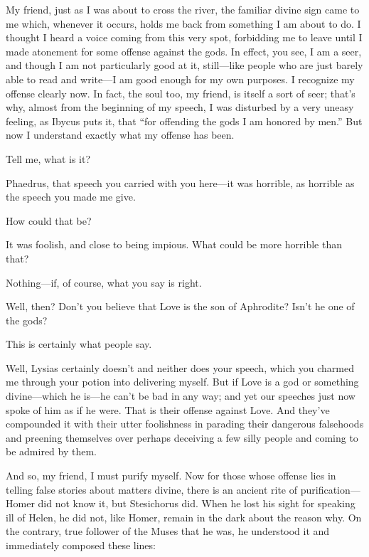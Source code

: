 \saysocrates My friend, just as I was about to cross the river, the
familiar divine sign came to me which, whenever it occurs, holds
me back from something I am about to do. I thought I heard a voice
coming from this very spot, forbidding me to leave until I made
atonement for some offense against the gods. In effect, you see, I am a
seer, and though I am not particularly good at it, still---like people
who are just barely able to read and write---I am good enough for my own
purposes. I recognize my offense clearly now. In fact, the soul too, my
friend, is itself a sort of seer; that’s why, almost from the beginning
of my speech, I was disturbed by a very uneasy feeling, as
Ibycus puts it, that “for offending the gods I am honored by
men.” But now I
understand exactly what my offense has been.

\sayphaedrus Tell me, what is it?

\saysocrates Phaedrus, that speech you carried with you here---it was
horrible, as horrible as the speech you made me give.

\sayphaedrus How could that be?

\saysocrates It was foolish, and close to being impious. What could be more
horrible than that?

\sayphaedrus Nothing---if, of course, what you say is right.

\saysocrates Well, then? Don’t you believe that Love is the son of
Aphrodite? Isn’t he one of the gods?

\sayphaedrus This is certainly what people say.

\saysocrates Well, Lysias certainly doesn’t and neither does your speech,
which you charmed me through your potion into delivering myself. But if
Love is a god or something divine---which he is---he can’t be bad in 
any way; and yet our speeches just now spoke of him as if he
were. That is their offense against Love. And they’ve compounded it with
their utter foolishness in parading their dangerous falsehoods and
preening themselves over perhaps deceiving a few silly
people and coming to be admired by them.

And so, my friend, I must purify myself. Now for those whose offense
lies in telling false stories about matters divine, there is an ancient
rite of purification---Homer did not know it, but Stesichorus did. When
he lost his sight for speaking ill of Helen, he did not, like Homer,
remain in the dark about the reason why. On the contrary, true follower
of the Muses that he was, he understood it and immediately composed
these lines:

